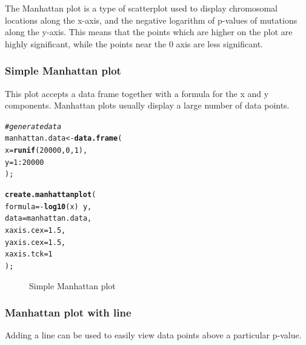 \documentclass[letterpaper]{article}\usepackage[]{graphicx}\usepackage[]{color}
\makeatletter
\newcommand{\hlnum}[1]{\textcolor[rgb]{0.686,0.059,0.569}{#1}}%
\newcommand{\hlcom}[1]{\textcolor[rgb]{0.678,0.584,0.686}{\textit{#1}}}%
\newcommand{\hlopt}[1]{\textcolor[rgb]{0,0,0}{#1}}%
\newcommand{\hlstd}[1]{\textcolor[rgb]{0.345,0.345,0.345}{#1}}%
\newcommand{\hlkwb}[1]{\textcolor[rgb]{0.69,0.353,0.396}{#1}}%
\newcommand{\hlkwc}[1]{\textcolor[rgb]{0.333,0.667,0.333}{#1}}%
\newcommand{\hlkwd}[1]{\textcolor[rgb]{0.737,0.353,0.396}{\textbf{#1}}}%
\newenvironment{kframe}{%
 \def\at@end@of@kframe{}%
 \ifinner\ifhmode%
  \def\at@end@of@kframe{\end{minipage}}%
  \begin{minipage}{\columnwidth}%
 \fi\fi%
 \def\FrameCommand##1{\hskip\@totalleftmargin \hskip-\fboxsep
 \colorbox{shadecolor}{##1}\hskip-\fboxsep
     \hskip-\linewidth \hskip-\@totalleftmargin \hskip\columnwidth}%
 \MakeFramed {\advance\hsize-\width
   \@totalleftmargin\z@ \linewidth\hsize
   \@setminipage}}%
 {\par\unskip\endMakeFramed%
 \at@end@of@kframe}
\newenvironment{knitrout}{}{} %
\makeatother
\begin{document}
The Manhattan plot is a type of scatterplot used to display chromosomal locations along the x-axis, and the negative logarithm of p-values of mutations along the y-axis. This means that the points which are higher on the plot are highly significant, while the points near the 0 axis are less significant.

\subsubsection{Simple Manhattan plot}
This plot accepts a data frame together with a formula for the x and y components. Manhattan plots usually display a large number of data points.

\begin{knitrout}
\color{fgcolor}\begin{kframe}
\begin{alltt}
\hlcom{# generate data}
\hlstd{manhattan.data} \hlkwb{<-} \hlkwd{data.frame}\hlstd{(}
    \hlkwc{x} \hlstd{=} \hlkwd{runif}\hlstd{(}\hlnum{20000}\hlstd{,} \hlnum{0}\hlstd{,} \hlnum{1}\hlstd{),}
    \hlkwc{y} \hlstd{=} \hlnum{1}\hlopt{:}\hlnum{20000}
    \hlstd{);}

\hlkwd{create.manhattanplot}\hlstd{(}
    \hlkwc{formula} \hlstd{=} \hlopt{-}\hlkwd{log10}\hlstd{(x)} \hlopt{~} \hlstd{y,}
    \hlkwc{data} \hlstd{= manhattan.data,}
    \hlkwc{xaxis.cex} \hlstd{=} \hlnum{1.5}\hlstd{,}
    \hlkwc{yaxis.cex} \hlstd{=} \hlnum{1.5}     \hlstd{,}
    \hlkwc{xaxis.tck} \hlstd{=} \hlnum{1}
    \hlstd{);}
\end{alltt}
\end{kframe}\begin{figure}

{\centering {} 

}

\caption[Simple Manhattan plot]{Simple Manhattan plot\label{fig:manhattan1}}
\end{figure}


\end{knitrout}

\subsubsection{Manhattan plot with line}
Adding a line can be used to easily view data points above a particular p-value.
\end{document}
